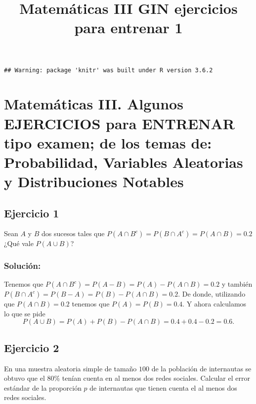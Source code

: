 \documentclass[]{article}
\title{Matemáticas III GIN ejercicios para entrenar 1}
\author{}
\date{\vspace{-2.5em}}
\begin{document}
\maketitle

{
\hypersetup{linkcolor=}
\setcounter{tocdepth}{2}
\tableofcontents
}
\begin{verbatim}
## Warning: package 'knitr' was built under R version 3.6.2
\end{verbatim}

\hypertarget{matemuxe1ticas-iii.-algunos-ejercicios-para-entrenar-tipo-examen-de-los-temas-de-probabilidad-variables-aleatorias-y-distribuciones-notables}{%
\section{Matemáticas III. Algunos EJERCICIOS para ENTRENAR tipo examen;
de los temas de: Probabilidad, Variables Aleatorias y Distribuciones
Notables}\label{matemuxe1ticas-iii.-algunos-ejercicios-para-entrenar-tipo-examen-de-los-temas-de-probabilidad-variables-aleatorias-y-distribuciones-notables}}

\hypertarget{ejercicio-1}{%
\subsection{Ejercicio 1}\label{ejercicio-1}}

Sean \(A\) y \(B\) dos sucesos tales que
\(P(A\cap B^c)=P(B\cap A^c)=P(A\cap B)=0.2\) ¿Qué vale \(P(A\cup B)\)?

\hypertarget{soluciuxf3n}{%
\subsubsection{Solución:}\label{soluciuxf3n}}

Tenemos que \(P(A\cap B^c)=P(A-B)=P(A)-P(A\cap B)=0.2\) y también
\(P(B\cap A^c)=P(B-A)=P(B)-P(A\cap B)=0.2\). De donde, utilizando que
\(P(A\cap B)=0.2\) tenemos que \(P(A)=P(B)=0.4\). Y ahora calculamos lo
que se pide \[P(A\cup B)=P(A)+P(B)-P(A\cap B)=0.4+0.4-0.2=0.6.\]

\hypertarget{ejercicio-2}{%
\subsection{Ejercicio 2}\label{ejercicio-2}}

En una muestra aleatoria simple de tamaño \(100\) de la población de
internautas se obtuvo que el 80\% tenían cuenta en al menos dos redes
sociales. Calcular el error estándar de la proporción \(p\) de
internautas que tienen cuenta el al menos dos redes sociales.
\end{document}
